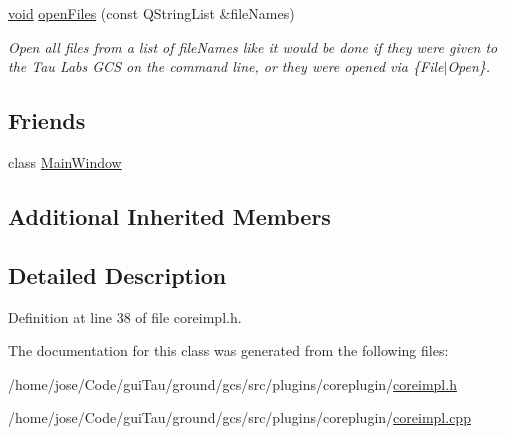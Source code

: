 \begin{DoxyCompactItemize}
\hyperlink{group___u_a_v_objects_plugin_ga444cf2ff3f0ecbe028adce838d373f5c}{void} \hyperlink{group___core_plugin_ga09fd8daa4a7ca2cd3c3262df8c1c227c}{open\-Files} (const Q\-String\-List \&file\-Names)
\begin{DoxyCompactList}\small\item\em Open all files from a list of {\itshape file\-Names} like it would be done if they were given to the Tau Labs G\-C\-S on the command line, or they were opened via \{File$|$\-Open\}. \end{DoxyCompactList}\end{DoxyCompactItemize}
\subsection*{Friends}
\begin{DoxyCompactItemize}
\item 
class \hyperlink{group___core_plugin_gaf9db4b672c4d3104f5541893e08e1809}{Main\-Window}
\end{DoxyCompactItemize}
\subsection*{Additional Inherited Members}


\subsection{Detailed Description}


Definition at line 38 of file coreimpl.\-h.



The documentation for this class was generated from the following files\-:\begin{DoxyCompactItemize}
\item 
/home/jose/\-Code/gui\-Tau/ground/gcs/src/plugins/coreplugin/\hyperlink{coreimpl_8h}{coreimpl.\-h}\item 
/home/jose/\-Code/gui\-Tau/ground/gcs/src/plugins/coreplugin/\hyperlink{coreimpl_8cpp}{coreimpl.\-cpp}\end{DoxyCompactItemize}

